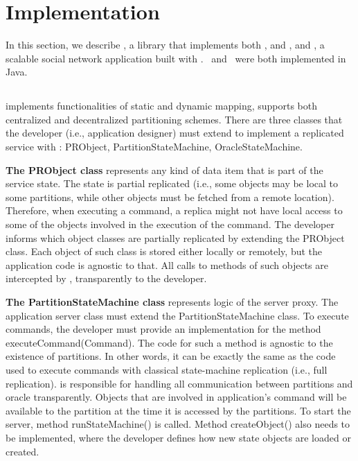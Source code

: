 \section{Implementation}
\label{sec:implementation}

In this section, we describe \libname{}, a library that implements both \ssmr{}, \dssmr{} and \dynastar{}, and \appname{}, a scalable social network application built with \libname{}. \libname\ and \appname\ were both implemented in Java.

\subsection{\libname}

\libname{} implements functionalities of static and dynamic mapping, supports both centralized and decentralized partitioning schemes. There 
are three classes that the developer (i.e., application designer) must extend to implement a replicated service with \libname{}: PRObject, 
PartitionStateMachine, OracleStateMachine.

\textbf{The PRObject class} represents any kind of data item that is part of the service state. The state is partial replicated (i.e., some 
objects may be local to some partitions, while other objects must be fetched from a remote location). Therefore, when executing a command, a 
replica might not have local access to some of the objects involved in the execution of the command. The developer informs \libname{} which 
object classes are partially replicated by extending the PRObject class. Each object of such class is stored either locally or remotely, but 
the application code is agnostic to that. All calls to methods of such objects are intercepted by \libname{}, transparently to the developer. 

\textbf{The PartitionStateMachine class} represents logic of the server proxy. The application server class must extend the 
PartitionStateMachine class. To execute commands, the developer must provide an implementation for the method executeCommand(Command). The code 
for such a method is agnostic to the existence of partitions. In other words, it can be exactly the same as the code used to execute commands 
with classical state-machine replication (i.e., full replication). \libname{} is responsible for handling all communication between partitions 
and oracle transparently. Objects that are involved in application's command will be available to the partition at the time it is accessed by the partitions. To start the server, method runStateMachine() is called. Method createObject() also needs to be implemented, where the 
developer defines how new state objects are loaded or created.


